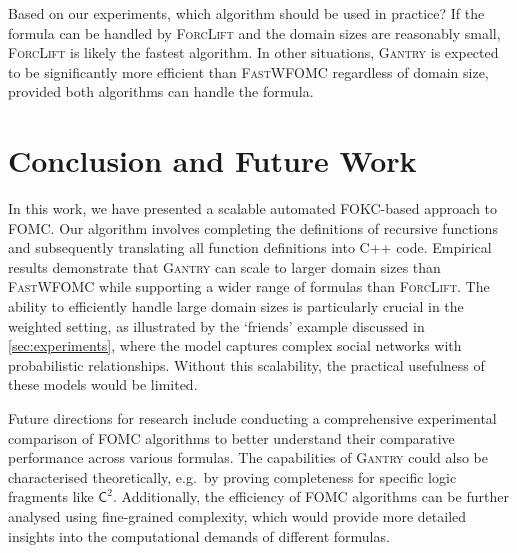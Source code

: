 \documentclass[a4paper,UKenglish,cleveref, autoref, thm-restate]{lipics-v2021}
\newcommand{\Ctwo}{$\mathsf{C}^{2}$}
\newcommand{\Cranetwo}{\textsc{Gantry}}
\begin{document}

Based on our experiments, which algorithm should be used in practice? If the
formula can be handled by \textsc{ForcLift} and the domain sizes are reasonably
small, \textsc{ForcLift} is likely the fastest algorithm. In other situations,
\Cranetwo{} is expected to be significantly more efficient than
\textsc{FastWFOMC} regardless of domain size, provided both algorithms can
handle the formula.

\section{Conclusion and Future Work}\label{sec:conclusion}

In this work, we have presented a scalable automated FOKC-based approach to
FOMC. Our algorithm involves completing the definitions of recursive functions
and subsequently translating all function definitions into C++ code. Empirical
results demonstrate that \Cranetwo{} can scale to larger domain sizes than
\textsc{FastWFOMC} while supporting a wider range of formulas than
\textsc{ForcLift}. The ability to efficiently handle large domain sizes is
particularly crucial in the weighted setting, as illustrated by the `friends'
example discussed in \cref{sec:experiments}, where the model captures complex
social networks with probabilistic relationships. Without this scalability, the
practical usefulness of these models would be limited.

Future directions for research include conducting a comprehensive experimental
comparison of FOMC algorithms to better understand their comparative performance
across various formulas. The capabilities of \Cranetwo{} could also be
characterised theoretically, e.g.\ by proving completeness for specific logic
fragments like \Ctwo{}. Additionally, the efficiency of FOMC algorithms can be
further analysed using fine-grained complexity, which would provide more
detailed insights into the computational demands of different formulas.


\end{document}
